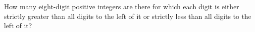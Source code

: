 How many eight-digit positive integers are there for which each digit is either strictly greater
than all digits to the left of it or strictly less than all digits to the left of it?